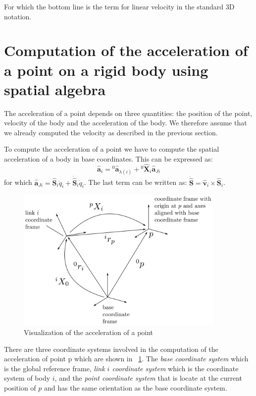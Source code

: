 \documentclass[a4paper]{article}
\newcommand{\Spa}[1]{\mathbf{\hat{#1}}}
\newcommand{\figref}[1]{\figurename~\ref{#1}}
\begin{document}
For which the bottom line is the term for linear velocity in the standard 3D
notation.

\section{Computation of the acceleration of a point on a rigid body using
spatial algebra}

The acceleration of a point depends on three quantities: the position of the
point, velocity of the body and the acceleration of the body. We therefore
assume that we already computed the velocity as described in the previous
section.

To compute the acceleration of a point we have to compute the spatial
acceleration of a body in base coordinates. This can be expressed as:
\begin{equation}
	\Spa{a}_i = {}^0\Spa{a}_{\lambda(i)}
	+ {}^{0}\Spa{X}_{i} \Spa{a}_{Ji}
\end{equation}
for which $\Spa{a}_{Ji} = \Spa{S}_i \ddot{q}_i + \dot{\Spa{S}}_i \dot{q}_i$.
The last term can be written as: $\dot{\Spa{S}} = \Spa{v}_i \times \Spa{S}_i$.

\begin{figure}[h!]
	\begin{center}
		\includegraphics[width=0.9\textwidth]{acceleration_visualization}
	\end{center}
	\caption{Visualization of the acceleration of a point}
	\label{fig:acceleration_visualization}
\end{figure}

There are three coordinate systems involved in the computation of the
acceleration of point p which are shown in
\figref{fig:acceleration_visualization}. The \emph{base coordinate system}
which is the global reference frame, \emph{link $i$ coordinate system}
which is the coordinate system of body $i$, and the \emph{point coordinate
system} that is locate at the current position of $p$ and has the same
orientation as the base coordinate system.
\end{document}
